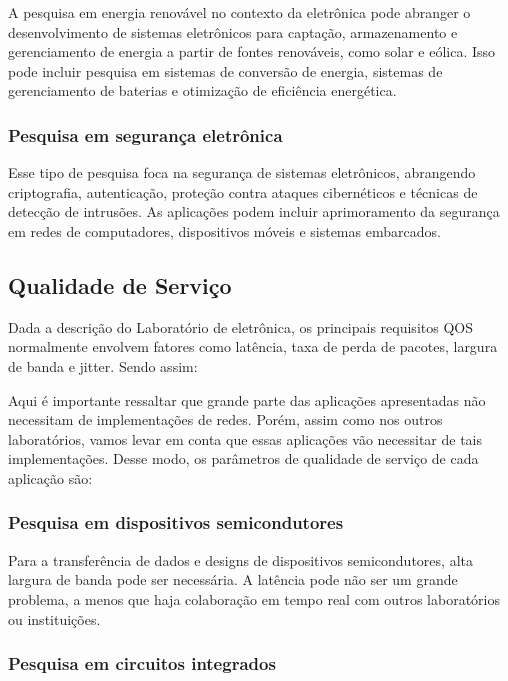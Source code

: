 A pesquisa em energia renovável no contexto da eletrônica pode abranger o desenvolvimento de sistemas eletrônicos para captação, armazenamento e gerenciamento de energia a partir de fontes renováveis, como solar e eólica. Isso pode incluir pesquisa em sistemas de conversão de energia, sistemas de gerenciamento de baterias e otimização de eficiência energética.

\subsubsection{Pesquisa em segurança eletrônica}

Esse tipo de pesquisa foca na segurança de sistemas eletrônicos, abrangendo criptografia, autenticação, proteção contra ataques cibernéticos e técnicas de detecção de intrusões. As aplicações podem incluir aprimoramento da segurança em redes de computadores, dispositivos móveis e sistemas embarcados.

\subsection{Qualidade de Serviço}

Dada a descrição do Laboratório de eletrônica, os principais requisitos QOS normalmente envolvem fatores como latência, taxa de perda de pacotes, largura de banda e jitter. Sendo assim:

Aqui é importante ressaltar que grande parte das aplicações apresentadas não necessitam de implementações de redes. Porém, assim como nos outros laboratórios, vamos levar em conta que essas aplicações vão necessitar de tais implementações. Desse modo, os parâmetros de qualidade de serviço de cada aplicação são:

\subsubsection{Pesquisa em dispositivos semicondutores}

Para a transferência de dados e designs de dispositivos semicondutores, alta largura de banda pode ser necessária. A latência pode não ser um grande problema, a menos que haja colaboração em tempo real com outros laboratórios ou instituições.

\subsubsection{Pesquisa em circuitos integrados}

